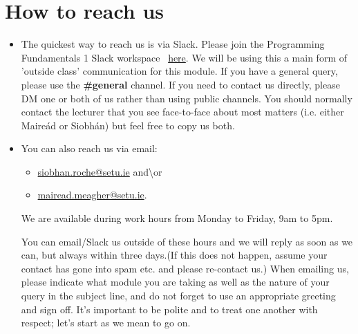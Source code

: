 \documentclass{article}
\begin{document}
\section{How to reach us}
\begin{itemize}
    \item The quickest way to reach us  is via Slack. 
    Please join the Programming Fundamentals 1 Slack workspace 
    \ \href{https://join.slack.com/t/progfund2025-2026/shared_invite/zt-37df9qgwi-gNEmD0q15QMT53DHASESLQ}{here}. 
    We  will be using this a main form of 'outside class' communication for this module. 
    If you have a general query, please use the \textbf{\#general} channel. 
    If you need to contact us directly, please DM one or both of us rather than using public channels. 
    You should  normally contact the lecturer that you see face-to-face about most matters 
    (i.e. either Maire\'ad or Siobh\'an) but feel free to copy us both. 
    \item You can also reach us  via email:
    \begin{itemize}
        \item \href{mailto:siobhan.roche@setu.ie}{siobhan.roche@setu.ie}   
    and\textbackslash{}or \item \href{mailto:mairead.meagher@setu.ie}{mairead.meagher@setu.ie}. 
\end{itemize} We are available during work hours from Monday to Friday, 9am to 5pm. 

    You can email/Slack us outside of these hours and we will reply as soon as we can, 
but always within three days.(If this does not happen, assume your contact has gone into spam etc. 
and please re-contact us.) When emailing us, please indicate what module you are taking as well as 
the nature of your query in the subject line, and do not forget to use an appropriate greeting and sign off. 
It’s important to be polite and to treat one another with 
respect; let’s start as we mean to go on.
   
\end{itemize}
\pagebreak
\end{document}
